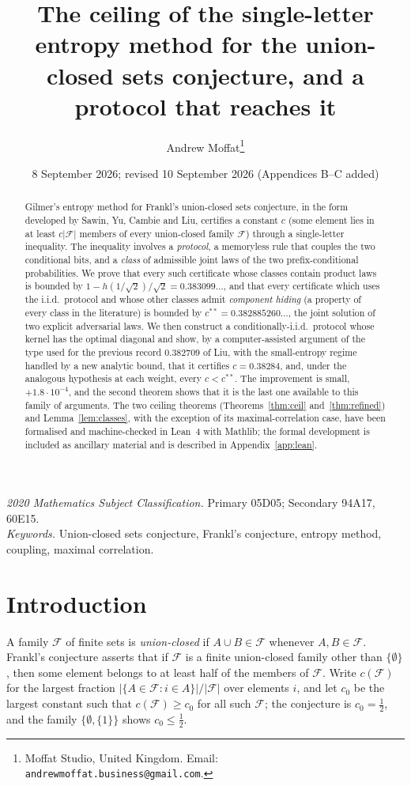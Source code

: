 \documentclass[11pt,a4paper]{article}
\title{The ceiling of the single-letter entropy method for the union-closed sets conjecture, and a protocol that reaches it}
\author{Andrew Moffat\thanks{Moffat Studio, United Kingdom. Email: \texttt{andrewmoffat.business@gmail.com}.}}
\date{8 September 2026; revised 10 September 2026 (Appendices B--C added)}
\theoremstyle{definition}
\theoremstyle{remark}
\newcommand{\F}{\mathcal{F}}
\newcommand{\ent}{h}
\begin{document}
\maketitle

\begin{abstract}
Gilmer's entropy method for Frankl's union-closed sets conjecture, in the form developed by Sawin, Yu, Cambie and Liu, certifies a constant $c$ (some element lies in at least $c|\F|$ members of every union-closed family $\F$) through a single-letter inequality. The inequality involves a \emph{protocol}, a memoryless rule that couples the two conditional bits, and a \emph{class} of admissible joint laws of the two prefix-conditional probabilities. We prove that every such certificate whose classes contain product laws is bounded by $1-\ent(1/\sqrt2)/\sqrt2=0.383099\ldots$, and that every certificate which uses the i.i.d.\ protocol and whose other classes admit \emph{component hiding} (a property of every class in the literature) is bounded by $c^{**}=0.382885260\ldots$, the joint solution of two explicit adversarial laws. We then construct a conditionally-i.i.d.\ protocol whose kernel has the optimal diagonal and show, by a computer-assisted argument of the type used for the previous record $0.382709$ of Liu, with the small-entropy regime handled by a new analytic bound, that it certifies $c=0.38284$, and, under the analogous hypothesis at each weight, every $c<c^{**}$. The improvement is small, $+1.8\cdot10^{-4}$, and the second theorem shows that it is the last one available to this family of arguments. The two ceiling theorems (Theorems~\ref{thm:ceil} and~\ref{thm:refined}) and Lemma~\ref{lem:classes}, with the exception of its maximal-correlation case, have been formalised and machine-checked in Lean~4 with Mathlib; the formal development is included as ancillary material and is described in Appendix~\ref{app:lean}.
\end{abstract}

\noindent\textit{2020 Mathematics Subject Classification.} Primary 05D05; Secondary 94A17, 60E15.\\
\textit{Keywords.} Union-closed sets conjecture, Frankl's conjecture, entropy method, coupling, maximal correlation.

\section{Introduction}\label{sec:intro}
A family $\F$ of finite sets is \emph{union-closed} if $A\cup B\in\F$ whenever $A,B\in\F$. Frankl's conjecture \cite{Frankl,BruhnSchaudt} asserts that if $\F$ is a finite union-closed family other than $\{\emptyset\}$, then some element belongs to at least half of the members of $\F$. Write $c(\F)$ for the largest fraction $|\{A\in\F:i\in A\}|/|\F|$ over elements $i$, and let $c_0$ be the largest constant such that $c(\F)\ge c_0$ for all such $\F$; the conjecture is $c_0=\tfrac12$, and the family $\{\emptyset,\{1\}\}$ shows $c_0\le\tfrac12$.
\end{document}
